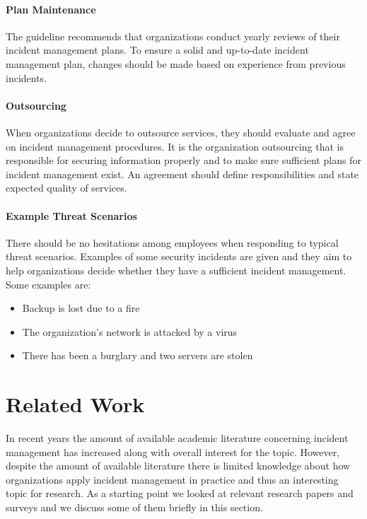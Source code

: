 \paragraph{Plan Maintenance}
The guideline recommends that organizations conduct yearly reviews of their incident management plans. To ensure a solid and up-to-date incident management plan, changes should be made based on experience from previous incidents. 

\paragraph{Outsourcing}
When organizations decide to outsource services, they should evaluate and agree on incident management procedures. It is the organization outsourcing that is responsible for securing information properly and to make sure sufficient plans for incident management exist. An agreement should define responsibilities and state expected quality of services. 

\paragraph{Example Threat Scenarios}
There should be no hesitations among employees when responding to typical threat scenarios. Examples of some security incidents are given and they aim to help organizations decide whether they have a sufficient incident management. Some examples are:
\begin{itemize}
\item Backup is lost due to a fire
\item The organization's network is attacked by a virus
\item There has been a burglary and two servers are stolen 
\end{itemize}



\section{Related Work}
In recent years the amount of available academic literature concerning incident management has increased along with overall interest for the topic. However, despite the amount of available literature there is limited knowledge about how organizations apply incident management in practice and thus an interesting topic for research. As a starting point we looked at relevant research papers and surveys and we discuss some of them briefly in this section.

